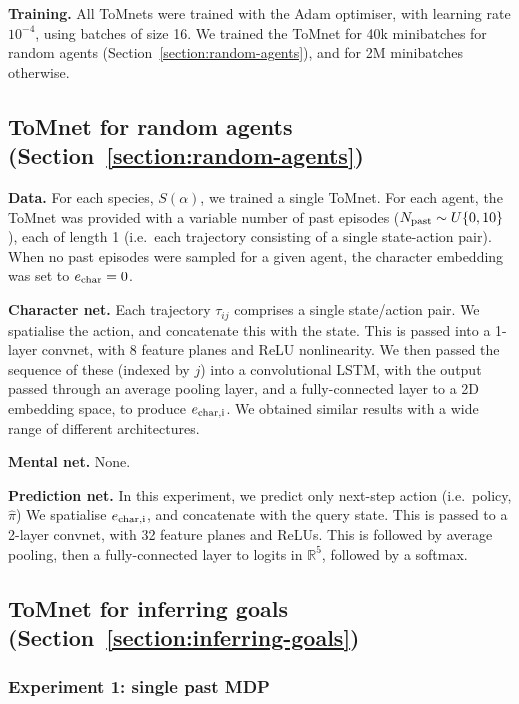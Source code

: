 \documentclass{article}
\begin{document}
{\bf Training.} All ToMnets were trained with the Adam optimiser, with learning rate $10^{-4}$, using batches of size 16. We trained the ToMnet for 40k minibatches for random agents (Section~\ref{section:random-agents}), and for 2M minibatches otherwise.

\subsection{ToMnet for random agents (Section~\ref{section:random-agents})}
\label{appendix:random-agents}

{\bf Data.} For each species, $S(\alpha)$, we trained a single ToMnet. For each agent, the ToMnet was provided with a variable number of past episodes ($N_{\mathrm{past}} \sim U\{0, 10\}$), each of length 1 (i.e.\ each trajectory consisting of a single state-action pair). When no past episodes were sampled for a given agent, the character embedding was set to $e_{\mathrm{char}} = 0$.

{\bf Character net.} Each trajectory $\tau_{ij}$ comprises a single state/action pair. We spatialise the action, and concatenate this with the state. This is passed into a 1-layer convnet, with 8 feature planes and ReLU nonlinearity. We then passed the sequence of these (indexed by $j$) into a convolutional LSTM, with the output passed through an average pooling layer, and a fully-connected layer to a 2D embedding space, to produce $e_{\mathrm{char,i}}$. We obtained similar results with a wide range of different architectures.

{\bf Mental net.} None.

{\bf Prediction net.} In this experiment, we predict only next-step action (i.e.\ policy, $\hat{\pi}$) We spatialise $e_{\mathrm{char,i}}$, and concatenate with the query state. This is passed to a 2-layer convnet, with 32 feature planes and ReLUs. This is followed by average pooling, then a fully-connected layer to logits in $\mathbb{R}^5$, followed by a softmax.


\subsection{ToMnet for inferring goals (Section~\ref{section:inferring-goals})}
\label{appendix:inferring-goals}

\subsubsection{Experiment 1: single past MDP}
\end{document}
